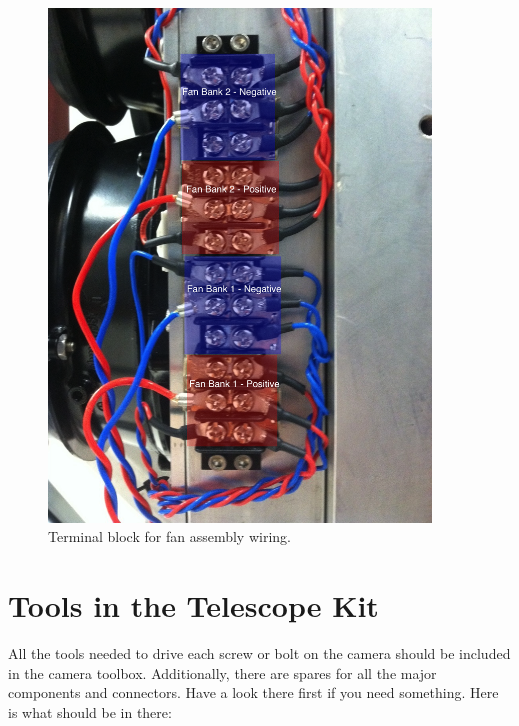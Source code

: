 \documentclass[11pt]{article}
\begin{document}
\begin{figure}[h]
\begin{center}
\includegraphics[width = 4in]{fanWiring.jpg}
\caption{Terminal block for fan assembly wiring.}  
\label{fanPic}
\end{center}
\end{figure}

\newpage
\section{Tools in the Telescope Kit}

All the tools needed to drive each screw or bolt on the camera should be included in the camera toolbox. 
Additionally, there are spares for all the major components and connectors.
Have a look there first if you need something.
Here is what should be in there:
\end{document}
